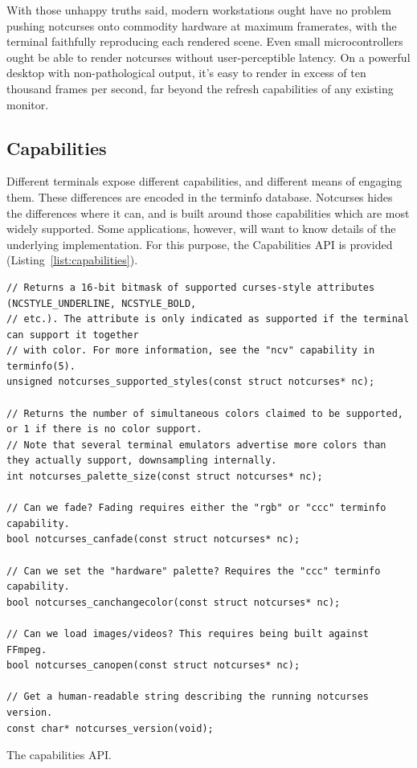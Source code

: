 \documentclass[letterpaper,10pt]{article}
\begin{document}
With those unhappy truths said, modern workstations ought have no problem pushing
notcurses onto commodity hardware at maximum framerates, with the terminal
faithfully reproducing each rendered scene. Even small microcontrollers ought
be able to render notcurses without user-perceptible latency. On a powerful
desktop with non-pathological output, it's easy to render in excess of
ten thousand frames per second, far beyond the refresh capabilities of any
existing monitor.

\subsection{Capabilities}
Different terminals expose different capabilities, and different means of
engaging them. These differences are encoded in the terminfo database\cite{terminfo}.
Notcurses hides the differences where it can, and is built around those
capabilities which are most widely supported. Some applications, however, will
want to know details of the underlying implementation. For this purpose, the
Capabilities API is provided (Listing~\ref{list:capabilities}).
\begin{listing}[!htb]
\begin{verbatim}
// Returns a 16-bit bitmask of supported curses-style attributes (NCSTYLE_UNDERLINE, NCSTYLE_BOLD,
// etc.). The attribute is only indicated as supported if the terminal can support it together
// with color. For more information, see the "ncv" capability in terminfo(5).
unsigned notcurses_supported_styles(const struct notcurses* nc);

// Returns the number of simultaneous colors claimed to be supported, or 1 if there is no color support.
// Note that several terminal emulators advertise more colors than they actually support, downsampling internally.
int notcurses_palette_size(const struct notcurses* nc);

// Can we fade? Fading requires either the "rgb" or "ccc" terminfo capability.
bool notcurses_canfade(const struct notcurses* nc);

// Can we set the "hardware" palette? Requires the "ccc" terminfo capability.
bool notcurses_canchangecolor(const struct notcurses* nc);

// Can we load images/videos? This requires being built against FFmpeg.
bool notcurses_canopen(const struct notcurses* nc);

// Get a human-readable string describing the running notcurses version.
const char* notcurses_version(void);
\end{verbatim}
\caption{The capabilities API.}
\label{list:capabilities}
\end{listing}
\end{document}
